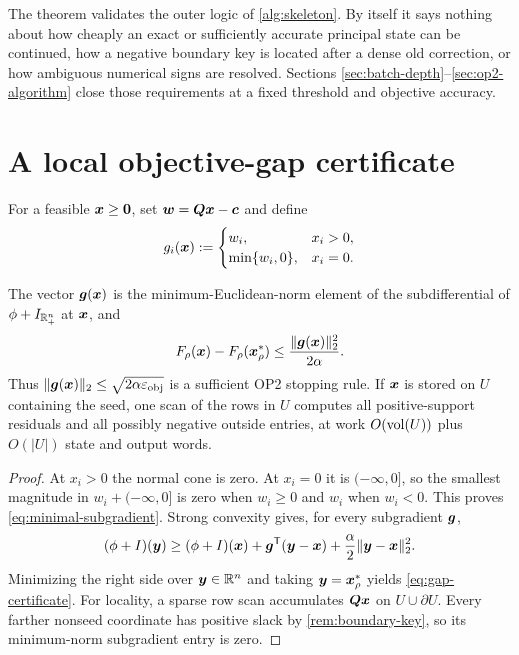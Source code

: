 The theorem validates the outer logic of \cref{alg:skeleton}.  By itself it
says nothing about how cheaply an exact or sufficiently accurate principal
state can be continued, how a negative boundary key is located after a dense
old correction, or how ambiguous numerical signs are resolved.  Sections
\ref{sec:batch-depth}--\ref{sec:op2-algorithm} close those requirements at a
fixed threshold and objective accuracy.

\section{A local objective-gap certificate}
\label{sec:certificate}

For a feasible $\bm{x}\geq\bm{0}$, set $\bm{w}=\bm{Q}\bm{x}-\bm{c}$ and define
\begin{equation}
 g_i(\bm{x}):=
 \begin{cases}
  w_i,&x_i>0,\\
  \min\{w_i,0\},&x_i=0.
 \end{cases}
 \label{eq:minimal-subgradient}
\end{equation}

\begin{theorem}
\label{thm:kkt-certificate}
The vector $\bm{g}(\bm{x})$ is the minimum-Euclidean-norm element of the
subdifferential of $\phi+I_{\mathbb{R}_+^n}$ at $\bm{x}$, and
\begin{equation}
 F_\rho(\bm{x})-F_\rho(\bm{x}_\rho^*)
 \leq\frac{\lVert\bm{g}(\bm{x})\rVert_2^2}{2\alpha}.
 \label{eq:gap-certificate}
\end{equation}
Thus $\lVert\bm{g}(\bm{x})\rVert_2\leq\sqrt{2\alpha\varepsilon_{\mathrm{obj}}}$ is a sufficient OP2
stopping rule.  If $\bm{x}$ is stored on $U$ containing the seed, one scan of
the rows in $U$ computes all positive-support residuals and all possibly
negative outside entries, at work $O(\operatorname{vol}(U))$ plus $O(|U|)$ state and output
words.
\end{theorem}

\begin{proof}
At $x_i>0$ the normal cone is zero.  At $x_i=0$ it is $(-\infty,0]$, so the
smallest magnitude in $w_i+(-\infty,0]$ is zero when $w_i\geq0$ and $w_i$
when $w_i<0$.  This proves \cref{eq:minimal-subgradient}.  Strong convexity
gives, for every subgradient $\bm{g}$,
\[
 (\phi+I)(\bm{y})\geq(\phi+I)(\bm{x})+\bm{g}^{\mathsf{T}}(\bm{y}-\bm{x})
       +\frac\alpha2\lVert\bm{y}-\bm{x}\rVert_2^2.
\]
Minimizing the right side over $\bm{y}\in\mathbb{R}^n$ and taking
$\bm{y}=\bm{x}_\rho^*$ yields \cref{eq:gap-certificate}.  For locality, a sparse
row scan accumulates $\bm{Q}\bm{x}$ on $U\cup\partial U$.  Every farther nonseed
coordinate has positive slack by \cref{rem:boundary-key}, so its minimum-norm
subgradient entry is zero.
\end{proof}

